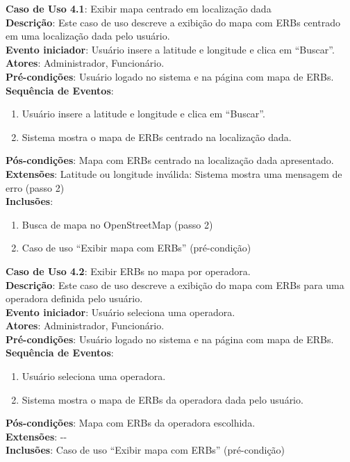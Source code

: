 \documentclass[]{politex}
\begin{document}
\noindent \textbf{Caso de Uso 4.1}: Exibir mapa centrado em localização dada \\
\textbf{Descrição}: Este caso de uso descreve a exibição do mapa com ERBs
centrado em uma localização dada pelo usuário.  \\
\textbf{Evento iniciador}: Usuário insere a latitude e longitude e clica em ``Buscar''. \\
\textbf{Atores}: Administrador, Funcionário. \\
\textbf{Pré-condições}: Usuário logado no sistema e na página com mapa de ERBs. \\
\textbf{Sequência de Eventos}:
\begin{enumerate}
\item Usuário insere a latitude e longitude e clica em ``Buscar''.
\item Sistema mostra o mapa de ERBs centrado na localização dada.
\end{enumerate}
\textbf{Pós-condições}: Mapa com ERBs centrado na localização dada apresentado. \\
\textbf{Extensões}: Latitude ou longitude inválida: Sistema mostra uma mensagem de erro (passo 2) \\
\textbf{Inclusões}:
\begin{enumerate}
\item Busca de mapa no OpenStreetMap (passo 2)
\item Caso de uso ``Exibir mapa com ERBs'' (pré-condição)
\end{enumerate}

\noindent \textbf{Caso de Uso 4.2}: Exibir ERBs no mapa por operadora. \\
\textbf{Descrição}: Este caso de uso descreve a exibição do mapa com ERBs para
uma operadora definida pelo usuário. \\
\textbf{Evento iniciador}: Usuário seleciona uma operadora. \\
\textbf{Atores}: Administrador, Funcionário. \\
\textbf{Pré-condições}: Usuário logado no sistema e na página com mapa de ERBs. \\
\textbf{Sequência de Eventos}:
\begin{enumerate}
\item Usuário seleciona uma operadora.
\item Sistema mostra o mapa de ERBs da operadora dada pelo usuário.
\end{enumerate}
\textbf{Pós-condições}: Mapa com ERBs da operadora escolhida. \\
\textbf{Extensões}: -{}- \\
\textbf{Inclusões}: Caso de uso ``Exibir mapa com ERBs'' (pré-condição) \\
\end{document}
